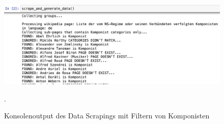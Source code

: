 \documentclass[ngerman]{ttlab-qualify}
\begin{document}
\begin{figure}[H]
\begin{center}
\includegraphics[width=15cm]{grafiken/Data_Scraping.png}
\caption[Konsolenoutput des Data Scrapings  mit Filtern von Komponisten]{Konsolenoutput des Data Scrapings  mit Filtern von Komponisten}.
\label{Data_Scraping}
\end{center}
\end{figure} 
\end{document}
